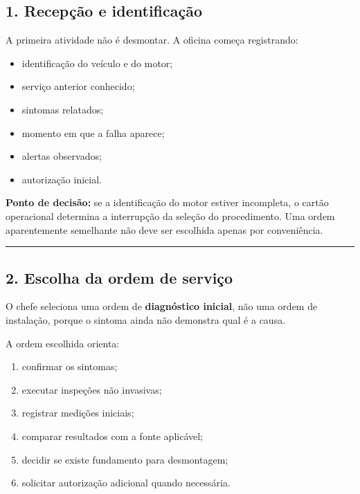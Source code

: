 \documentclass[
  10pt,
  a4paper,
  oneside]{book}
\providecommand{\tightlist}{%
  \setlength{\itemsep}{0pt}\setlength{\parskip}{0pt}}
\begin{document}
\hypertarget{recepuxe7uxe3o-e-identificauxe7uxe3o}{%
\subsection{1. Recepção e
identificação}\label{recepuxe7uxe3o-e-identificauxe7uxe3o}}

A primeira atividade não é desmontar. A oficina começa registrando:

\begin{itemize}
\tightlist
\item
  identificação do veículo e do motor;
\item
  serviço anterior conhecido;
\item
  sintomas relatados;
\item
  momento em que a falha aparece;
\item
  alertas observados;
\item
  autorização inicial.
\end{itemize}

\textbf{Ponto de decisão:} se a identificação do motor estiver
incompleta, o cartão operacional determina a interrupção da seleção do
procedimento. Uma ordem aparentemente semelhante não deve ser escolhida
apenas por conveniência.

\begin{center}\rule{0.5\linewidth}{0.5pt}\end{center}

\hypertarget{escolha-da-ordem-de-serviuxe7o}{%
\subsection{2. Escolha da ordem de
serviço}\label{escolha-da-ordem-de-serviuxe7o}}

O chefe seleciona uma ordem de \textbf{diagnóstico inicial}, não uma
ordem de instalação, porque o sintoma ainda não demonstra qual é a
causa.

A ordem escolhida orienta:

\begin{enumerate}
\def\labelenumi{\arabic{enumi}.}
\tightlist
\item
  confirmar os sintomas;
\item
  executar inspeções não invasivas;
\item
  registrar medições iniciais;
\item
  comparar resultados com a fonte aplicável;
\item
  decidir se existe fundamento para desmontagem;
\item
  solicitar autorização adicional quando necessária.
\end{enumerate}
\end{document}
